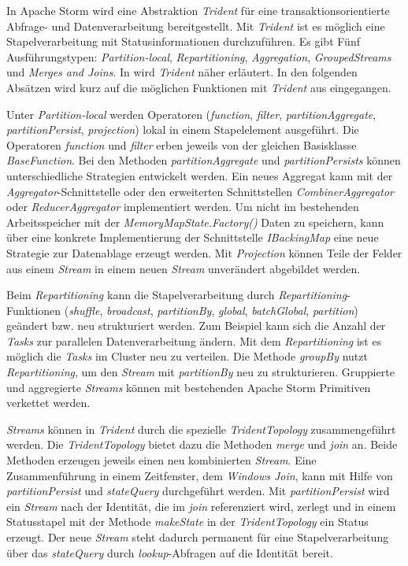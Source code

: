 In Apache Storm wird eine Abstraktion \textit{Trident} für eine transaktionsorientierte Abfrage- und Datenverarbeitung bereitgestellt. Mit \textit{Trident} ist es möglich eine Stapelverarbeitung mit Statusinformationen durchzuführen. Es gibt Fünf Ausführungstypen: \textit{Partition-local}, \textit{Repartitioning}, \textit{Aggregation}, \textit{GroupedStreams} und \textit{Merges and Joins}. In  wird \textit{Trident} näher erläutert. In den folgenden Absätzen wird kurz auf die möglichen Funktionen mit \textit{Trident} aus  eingegangen.

Unter \textit{Partition-local} werden Operatoren (\textit{function}, \textit{filter}, \textit{partitionAggregate}, \textit{partitionPersist}, \textit{projection}) lokal in einem Stapelelement ausgeführt. Die Operatoren \textit{function} und \textit{filter} erben jeweils von der gleichen Basisklasse \textit{BaseFunction}. Bei den Methoden \textit{partitionAggregate} und \textit{partitionPersists} können unterschiedliche Strategien entwickelt werden. Ein neues Aggregat kann mit der \textit{Aggregator}-Schnittstelle oder den erweiterten Schnittstellen \textit{CombinerAggregator} oder \textit{ReducerAggregator} implementiert werden. Um nicht im bestehenden Arbeitsspeicher mit der \textit{MemoryMapState.Factory()} Daten zu speichern, kann über eine konkrete Implementierung der Schnittstelle \textit{IBackingMap} eine neue Strategie zur Datenablage erzeugt werden. Mit \textit{Projection} können Teile der Felder aus einem \textit{Stream} in einem neuen \textit{Stream} unverändert abgebildet werden.

Beim \textit{Repartitioning} kann die Stapelverarbeitung durch \textit{Repartitioning}-Funktionen (\textit{shuffle}, \textit{broadcast}, \textit{partitionBy}, \textit{global}, \textit{batchGlobal}, \textit{partition}) geändert bzw. neu strukturiert werden. Zum Beispiel kann sich die Anzahl der \textit{Tasks} zur parallelen Datenverarbeitung ändern. Mit dem \textit{Repartitioning} ist es möglich die \textit{Tasks} im Cluster neu zu verteilen. Die Methode \textit{groupBy} nutzt \textit{Repartitioning}, um den \textit{Stream} mit \textit{partitionBy} neu zu strukturieren. Gruppierte und aggregierte \textit{Streams} können mit bestehenden Apache Storm Primitiven verkettet werden.

\textit{Streams} können in \textit{Trident} durch die spezielle \textit{TridentTopology} zusammengeführt werden. Die \textit{TridentTopology} bietet dazu die Methoden \textit{merge} und \textit{join} an. Beide Methoden erzeugen jeweils einen neu kombinierten \textit{Stream}. Eine Zusammenführung in einem Zeitfenster, dem \textit{Windows Join}, kann mit Hilfe von \textit{partitionPersist} und \textit{stateQuery} durchgeführt werden. Mit \textit{partitionPersist} wird ein \textit{Stream} nach der Identität, die im \textit{join} referenziert wird, zerlegt und in einem Statusstapel mit der Methode \textit{makeState} in der \textit{TridentTopology} ein Status erzeugt. Der neue \textit{Stream} steht dadurch permanent für eine Stapelverarbeitung über das \textit{stateQuery} durch \textit{lookup}-Abfragen auf die Identität bereit. 

